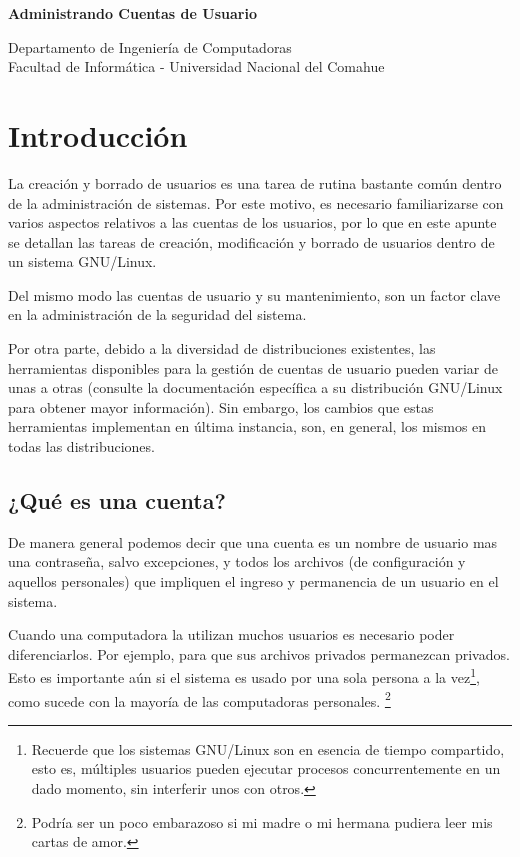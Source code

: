 \documentclass[12pt]{article}
\def\maketitle{

 \makeatletter
 {\color{bl} \centering \huge \sc \textbf{
Administrando Cuentas de Usuario \\
 \vspace*{8pt} }\par}
 \makeatother


 \makeatletter
 {\centering \small 
 	Departamento de Ingeniería de Computadoras \\
 	Facultad de Informática - Universidad Nacional del Comahue \\
 	\vspace{20pt} }
 \makeatother

}
\begin{document}
\thispagestyle{empty}
\maketitle
\setlength{\parindent}{0pt}




\section*{Introducción}
La creación y borrado de usuarios es una tarea de rutina bastante 
común dentro de la administración de sistemas. Por este motivo, 
es necesario familiarizarse con varios aspectos relativos a las
cuentas de los usuarios, por lo que en este apunte se detallan 
las tareas de creación, modificación y borrado de usuarios dentro 
de un sistema GNU/Linux.

Del mismo modo las cuentas de usuario y su mantenimiento, son un 
factor clave en la administración de la seguridad del sistema.

Por otra parte, debido a la diversidad de distribuciones existentes,
las herramientas disponibles para la gestión de cuentas de usuario pueden 
variar de unas a otras (consulte la documentación
específica a su distribución GNU/Linux para obtener mayor información). Sin 
embargo, los cambios que estas herramientas implementan  en última instancia, 
son, en general, los mismos en todas las distribuciones.  

\subsection*{¿Qué es una cuenta?}
De manera general podemos decir que una cuenta es un nombre de usuario 
mas una contraseña, salvo excepciones, y todos los archivos 
(de configuración y aquellos personales) que
impliquen el ingreso y permanencia de un usuario en el sistema.

Cuando una computadora la utilizan muchos usuarios es necesario poder
diferenciarlos. Por ejemplo, para que sus archivos privados
permanezcan privados. Esto es importante aún si el sistema es usado por una
sola persona a la vez\footnote{Recuerde que los sistemas GNU/Linux son 
en esencia de tiempo compartido, esto es, múltiples usuarios pueden ejecutar
procesos concurrentemente en un dado momento, sin interferir unos con otros.},
como sucede con la mayoría de las computadoras personales.
\footnote{Podría ser un poco embarazoso si mi madre o mi hermana pudiera leer 
mis cartas de amor.} 
\end{document}
